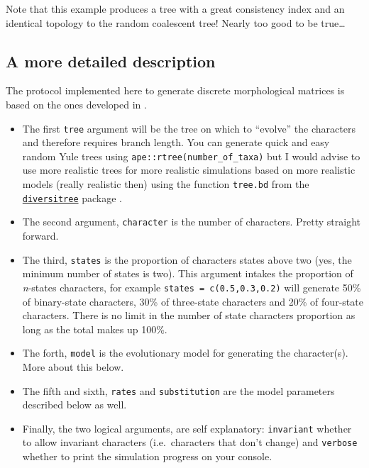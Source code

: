 \documentclass[]{book}
\providecommand{\tightlist}{%
  \setlength{\itemsep}{0pt}\setlength{\parskip}{0pt}}
\theoremstyle{definition}
\theoremstyle{definition}
\theoremstyle{remark}
\begin{document}
Note that this example produces a tree with a great consistency index
and an identical topology to the random coalescent tree! Nearly too good
to be true\ldots{}

\subsection{A more detailed
description}\label{a-more-detailed-description}

The protocol implemented here to generate discrete morphological
matrices is based on the ones developed in
\citep{GuillermeCooper, OReilly2016, puttick2017uncertain, OReilly2017}.

\begin{itemize}
\tightlist
\item
  The first \texttt{tree} argument will be the tree on which to
  ``evolve'' the characters and therefore requires branch length. You
  can generate quick and easy random Yule trees using
  \texttt{ape::rtree(number\_of\_taxa)} but I would advise to use more
  realistic trees for more realistic simulations based on more realistic
  models (really realistic then) using the function \texttt{tree.bd}
  from the
  \href{http://www.zoology.ubc.ca/prog/diversitree/}{\texttt{diversitree}}
  package \citep{fitzjohndiversitree2012}.
\item
  The second argument, \texttt{character} is the number of characters.
  Pretty straight forward.
\item
  The third, \texttt{states} is the proportion of characters states
  above two (yes, the minimum number of states is two). This argument
  intakes the proportion of \emph{n}-states characters, for example
  \texttt{states\ =\ c(0.5,0.3,0.2)} will generate 50\% of binary-state
  characters, 30\% of three-state characters and 20\% of four-state
  characters. There is no limit in the number of state characters
  proportion as long as the total makes up 100\%.
\item
  The forth, \texttt{model} is the evolutionary model for generating the
  character(s). More about this below.
\item
  The fifth and sixth, \texttt{rates} and \texttt{substitution} are the
  model parameters described below as well.
\item
  Finally, the two logical arguments, are self explanatory:
  \texttt{invariant} whether to allow invariant characters
  (i.e.~characters that don't change) and \texttt{verbose} whether to
  print the simulation progress on your console.
\end{itemize}
\end{document}
